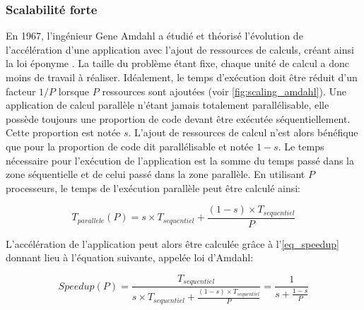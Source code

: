     \subsubsection{Scalabilité forte} \label{sec:amdhal}
        
        En 1967, l'ingénieur Gene Amdahl a étudié et théorisé l'évolution de l'accélération d'une application avec l'ajout de ressources de calculs, créant ainsi la loi éponyme \cite{Amdahl1967}. La taille du problème étant fixe, chaque unité de calcul a donc moins de travail à réaliser. Idéalement, le temps d'exécution doit être réduit d'un facteur $1/P$ lorsque $P$ ressources sont ajoutées (voir \autoref{fig:scaling_amdahl}). Une application de calcul parallèle n'étant jamais totalement parallélisable, elle possède toujours une proportion de code devant être exécutée séquentiellement. Cette proportion est notée $s$. L'ajout de ressources de calcul n'est alors bénéfique que pour la proportion de code dit parallélisable et notée $1-s$. Le temps nécessaire pour l'exécution de l'application est la somme du temps passé dans la zone séquentielle et de celui passé dans la zone parallèle. En utilisant $P$ processeurs, le temps de l'exécution parallèle peut être calculé ainsi: 

        
            \begin{equation}
            T_{parallele}(P) = s \times T_{sequentiel} + \frac{(1-s) \times T_{sequentiel}}{P}
            \end{equation}
        
        L'accélération de l'application peut alors être calculée grâce à l'\autoref{eq_speedup} donnant lieu à l'équation suivante, appelée loi d'Amdahl:
        
                
            \begin{equation}
            \label{eq_amdahl}
            Speedup (P) = \frac{T_{sequentiel}}{s \times T_{sequentiel} + \frac{(1-s) \times T_{sequentiel}}{P}} =  \frac{1}{s + \frac{1-s}{P}}
            \end{equation}
        
